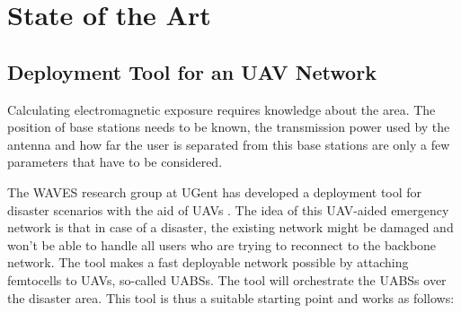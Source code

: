 \chapter{State of the Art}
\label{chap:stateoftheart}

\section{Deployment Tool for an UAV Network}
\label{sec:stateoftheart:deploymenttool}

Calculating electromagnetic exposure requires knowledge about the area. The position of base stations needs to be known,
 the transmission power used by the antenna and how far the user is separated from this base stations are only a few parameters
 that have to be considered.

The WAVES research group at UGent has developed a deployment tool for disaster scenarios with the aid of UAVs \cite{J2}.
The idea of this UAV-aided emergency network is that in case of a disaster, the existing network might be damaged and won't be able 
to handle all users who are trying to reconnect to the backbone network. 
The tool makes a fast deployable network possible by attaching femtocells to UAVs, so-called \gls{UABS}s.
The tool will orchestrate the \gls{UABS}s over the disaster area. This tool is thus a suitable starting point and works as follows:


